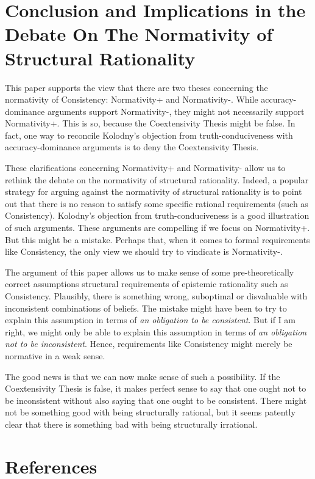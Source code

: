 \documentclass[
]{article}
\begin{document}
\hypertarget{PREFIXconclusion-and-implications-in-the-debate-on-the-normativity-of-structural-rationality}{%
\section{Conclusion and Implications in the Debate On The Normativity of
Structural
Rationality}\label{PREFIXconclusion-and-implications-in-the-debate-on-the-normativity-of-structural-rationality}}

This paper supports the view that there are two theses concerning the
normativity of Consistency: Normativity+ and Normativity-. While
accuracy-dominance arguments support Normativity-, they might not
necessarily support Normativity+. This is so, because the Coextensivity
Thesis might be false. In fact, one way to reconcile Kolodny's objection
from truth-conduciveness with accuracy-dominance arguments is to deny
the Coextensivity Thesis.

These clarifications concerning Normativity+ and Normativity- allow us
to rethink the debate on the normativity of structural rationality.
Indeed, a popular strategy for arguing against the normativity of
structural rationality is to point out that there is no reason to
satisfy some specific rational requirements (such as Consistency).
Kolodny's objection from truth-conduciveness is a good illustration of
such arguments. These arguments are compelling if we focus on
Normativity+. But this might be a mistake. Perhaps that, when it comes
to formal requirements like Consistency, the only view we should try to
vindicate is Normativity-.

The argument of this paper allows us to make sense of some
pre-theoretically correct assumptions structural requirements of
epistemic rationality such as Consistency. Plausibly, there is something
wrong, suboptimal or disvaluable with inconsistent combinations of
beliefs. The mistake might have been to try to explain this assumption
in terms of \emph{an obligation to be consistent}. But if I am right, we
might only be able to explain this assumption in terms of \emph{an
obligation not to be inconsistent}. Hence, requirements like Consistency
might merely be normative in a weak sense.

The good news is that we can now make sense of such a possibility. If
the Coextensivity Thesis is false, it makes perfect sense to say that
one ought not to be inconsistent without also saying that one ought to
be consistent. There might not be something good with being structurally
rational, but it seems patently clear that there is something bad with
being structurally irrational.

\hypertarget{PREFIXreferences}{%
\section{References}\label{PREFIXreferences}}
\end{document}
